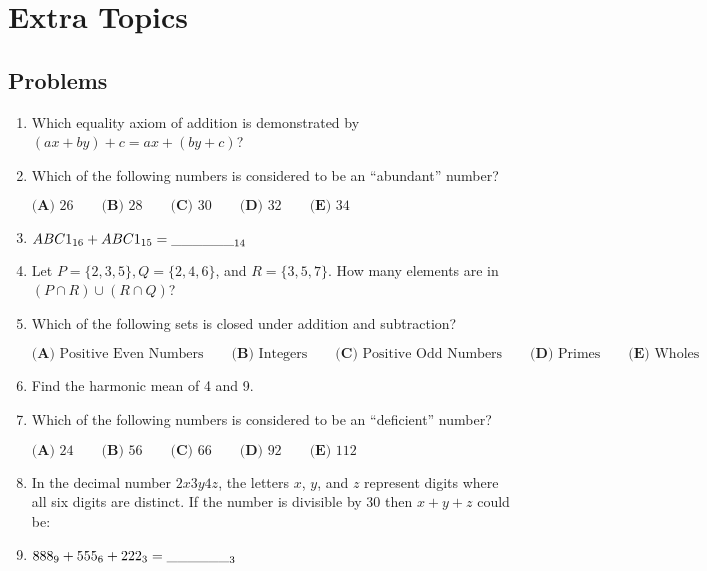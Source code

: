 \documentclass[../uilmath.tex]{subfiles}
\begin{document}
\chapter{Extra Topics}
\section*{Problems}
\begin{enumerate}[label=\bfseries\arabic*.]
    \item %
    Which equality axiom of addition is demonstrated by $(ax+by)+c=ax+(by+c)$?

    \item %
    Which of the following numbers is considered to be an ``abundant'' number?

    $\textbf{(A) } 26 \qquad \textbf{(B) } 28 \qquad \textbf{(C) } 30 \qquad \textbf{(D) } 32 \qquad \textbf{(E) } 34$

    \item %
    $ABC1_{16}+ABC1_{15}=\_\_\_\_\_\__{14}$

    \item %
    Let $P=\{2,3,5\}, Q=\{2,4,6\}$, and $R=\{3,5,7\}$. How many elements are in $(P\cap R)\cup(R\cap Q)$?

    \item %
    Which of the following sets is closed under addition and subtraction?

    $\textbf{(A) } \text{Positive Even Numbers} \qquad \textbf{(B) } \text{Integers} \qquad \textbf{(C) } \text{Positive Odd Numbers} \qquad \textbf{(D) } \text{Primes} \qquad \textbf{(E) } \text{Wholes}$

    \item %
    Find the harmonic mean of 4 and 9.

    \item %
    Which of the following numbers is considered to be an ``deficient'' number?

    $\textbf{(A) } 24 \qquad \textbf{(B) } 56 \qquad \textbf{(C) } 66 \qquad \textbf{(D) } 92 \qquad \textbf{(E) } 112$

    \item %
    In the decimal number $2x3y4z$, the letters $x$, $y$, and $z$ represent digits where all six digits are distinct.
    If the number is divisible by 30 then $x+y+z$ could be: 

    \item %
    $888_9 + 555_6 + 222_3 = \_\_\_\_\_\__3$


\end{enumerate}
\end{document}
